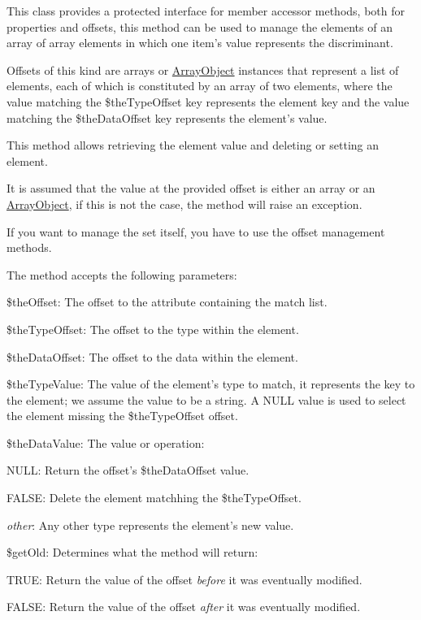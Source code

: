 This class provides a protected interface for member accessor methods, both for properties and offsets, this method can be used to manage the elements of an array of array elements in which one item's value represents the discriminant.

Offsets of this kind are arrays or \hyperlink{}{Array\-Object} instances that represent a list of elements, each of which is constituted by an array of two elements, where the value matching the {\ttfamily \$the\-Type\-Offset} key represents the element key and the value matching the {\ttfamily \$the\-Data\-Offset} key represents the element's value.

This method allows retrieving the element value and deleting or setting an element.

It is assumed that the value at the provided offset is either an array or an \hyperlink{}{Array\-Object}, if this is not the case, the method will raise an exception.

If you want to manage the set itself, you have to use the offset management methods.

The method accepts the following parameters\-:


\begin{DoxyItemize}
\item {\ttfamily \$the\-Offset}\-: The offset to the attribute containing the match list. 
\item {\ttfamily \$the\-Type\-Offset}\-: The offset to the type within the element. 
\item {\ttfamily \$the\-Data\-Offset}\-: The offset to the data within the element. 
\item {\ttfamily \$the\-Type\-Value}\-: The value of the element's type to match, it represents the key to the element; we assume the value to be a string. A {\ttfamily N\-U\-L\-L} value is used to select the element missing the {\ttfamily \$the\-Type\-Offset} offset. 
\item {\ttfamily \$the\-Data\-Value}\-: The value or operation\-: 
\begin{DoxyItemize}
\item {\ttfamily N\-U\-L\-L}\-: Return the offset's {\ttfamily \$the\-Data\-Offset} value. 
\item {\ttfamily F\-A\-L\-S\-E}\-: Delete the element matchhing the {\ttfamily \$the\-Type\-Offset}. 
\item {\itshape other}\-: Any other type represents the element's new value. 
\end{DoxyItemize}
\item {\ttfamily \$get\-Old}\-: Determines what the method will return\-: 
\begin{DoxyItemize}
\item {\ttfamily T\-R\-U\-E}\-: Return the value of the offset {\itshape before} it was eventually modified. 
\item {\ttfamily F\-A\-L\-S\-E}\-: Return the value of the offset {\itshape after} it was eventually modified. 
\end{DoxyItemize}
\end{DoxyItemize}

